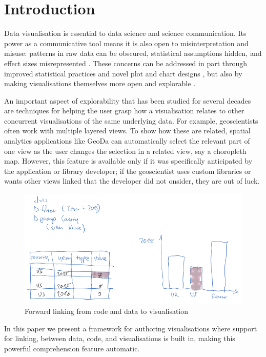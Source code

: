 \section{Introduction}

Data visualisation is essential to data science and science communication. Its
power as a communicative tool means it is also open to misinterpretation and
misuse: patterns in raw data can be obscured, statistical assumptions hidden,
and effect sizes misrepresented \cite{weissgerber15}. These concerns can be
addressed in part through improved statistical practices and novel plot and
chart designs \cite{allen19}, but also by making visualisations themselves more
open and explorable \cite{dragicevic19}.

An important aspect of explorability that has been studied for several decades
are techniques for helping the user grasp how a visualisation relates to other
concurrent visualisations of the same underlying data. For example,
geoscientists often work with multiple layered views. To show how these are
related, spatial analytics applications like GeoDa \cite{anselin06} can
automatically select the relevant part of one view as the user changes the
selection in a related view, say a choropleth map. However, this feature is
available only if it was specifically anticipated by the application or library
developer; if the geoscientist uses custom libraries or wants other views linked
that the developer did not onsider, they are out of luck.

\begin{figure}[H]
\includegraphics[scale=0.35]{image/chart-fwd}
\caption{Forward linking from code and data to visualisation}
\end{figure}

In this paper we present a framework for authoring visualisations where support
for linking, between data, code, and visualisations is built in, making this
powerful comprehension feature automatic.

